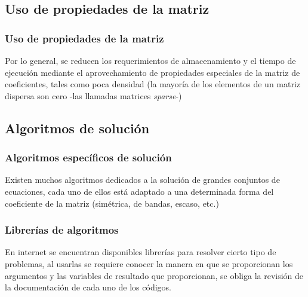 \subsection*{Uso de propiedades de la matriz}
\begin{frame}
\frametitle{Uso de propiedades de la matriz}
Por lo general, se reducen los requerimientos de almacenamiento y el tiempo de ejecución mediante el aprovechamiento de propiedades especiales de la matriz de coeficientes, tales como poca densidad (la mayoría de los elementos de un matriz dispersa son cero -las llamadas matrices \textit{sparse}-)
\end{frame}
\subsection*{Algoritmos de solución}
\begin{frame}
\frametitle{Algoritmos específicos de solución}
Existen muchos algoritmos dedicados a la solución de grandes conjuntos de ecuaciones, cada uno de ellos está adaptado a una determinada forma del coeficiente de la matriz (simétrica, de bandas, escaso, etc.)
\end{frame}
\begin{frame}
\frametitle{Librerías de algoritmos}
En internet se encuentran disponibles librerías para resolver cierto tipo de problemas, al usarlas se requiere conocer la manera en que se proporcionan los argumentos y las variables de resultado que proporcionan, se obliga la revisión de la documentación de cada uno de los códigos.
\end{frame}
